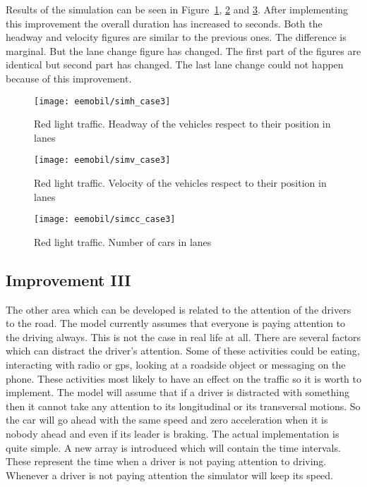		Results of the simulation can be seen in Figure~\ref{fig:red_light_situationh_impr2}, \ref{fig:red_light_situationv_impr2} and \ref{fig:red_light_situationcc_impr2}. After implementing this improvement the overall duration has increased to seconds. Both the headway and velocity figures are similar to the previous ones. The difference is marginal. But the lane change figure has changed. The first part of the figures are identical but second part has changed. The last lane change could not happen because of this improvement.
		\begin{figure}[ht]
			\centering
			\texttt{[image: eemobil/simh\_case3]}
			\caption{Red light traffic. Headway of the vehicles respect to their position in lanes}
			\label{fig:red_light_situationh_impr2}
		\end{figure}
		\begin{figure}
			\centering
			\texttt{[image: eemobil/simv\_case3]}
			\caption{Red light traffic. Velocity of the vehicles respect to their position in lanes}
			\label{fig:red_light_situationv_impr2}
		\end{figure}
		\begin{figure}
			\centering
			\texttt{[image: eemobil/simcc\_case3]}
			\caption{Red light traffic. Number of cars in lanes }
			\label{fig:red_light_situationcc_impr2}
		\end{figure}
		\subsection{Improvement III}
		The other area which can be developed is related to the attention of the drivers to the road. The model currently assumes that everyone is paying attention to the driving always. This is not the case in real life at all. There are several factors which can distract the driver's attention. Some of these activities could be eating, interacting with radio or gps, looking at a roadside object or messaging on the phone. These activities most likely to have an effect on the traffic so it is worth to implement. The model will assume that if a driver is distracted with something then it cannot take any attention to its longitudinal or its transversal motions. So the car will go ahead with the same speed and zero acceleration when it is nobody ahead and even if its leader is braking. The actual implementation is quite simple. A new array is introduced which will contain the time intervals. These represent the time when a driver is not paying attention to driving. Whenever a driver is not paying attention the simulator will keep its speed.

